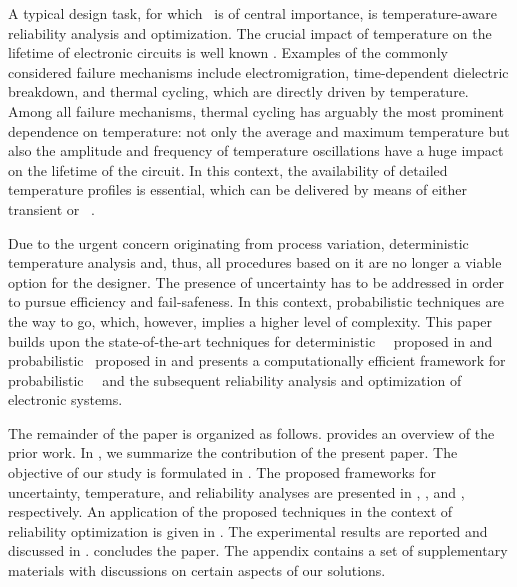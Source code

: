 A typical design task, for which \ta\ is of central importance, is temperature-aware reliability analysis and optimization.
The crucial impact of temperature on the lifetime of electronic circuits is well known \cite{jedec}.
Examples of the commonly considered failure mechanisms include electromigration, time-dependent dielectric breakdown, and thermal cycling, which are directly driven by temperature.
Among all failure mechanisms, thermal cycling has arguably the most prominent dependence on temperature: not only the average and maximum temperature but also the amplitude and frequency of temperature oscillations have a huge impact on the lifetime of the circuit.
In this context, the availability of detailed temperature profiles is essential, which can be delivered by means of either transient or \DSS\ \ta.

Due to the urgent concern originating from process variation, deterministic temperature analysis and, thus, all procedures based on it are no longer a viable option for the designer.
The presence of uncertainty has to be addressed in order to pursue efficiency and fail-safeness.
In this context, probabilistic techniques are the way to go, which, however, implies a higher level of complexity.
This paper builds upon the state-of-the-art techniques for deterministic \DSS\ \ta\ proposed in \cite{ukhov2012} and probabilistic \tta\ proposed in \cite{ukhov2014} and presents a computationally efficient framework for probabilistic \DSS\ \ta\ and the subsequent reliability analysis and optimization of electronic systems.

The remainder of the paper is organized as follows.
 provides an overview of the prior work.
In , we summarize the contribution of the present paper.
The objective of our study is formulated in .
The proposed frameworks for uncertainty, temperature, and reliability analyses are presented in , , and , respectively.
An application of the proposed techniques in the context of reliability optimization is given in .
The experimental results are reported and discussed in .
 concludes the paper.
The appendix contains a set of supplementary materials with discussions on certain aspects of our solutions.
